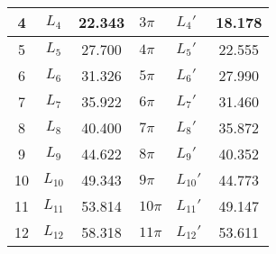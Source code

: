 \documentclass{../template/Report}
\begin{document}
\begin{fullreportonly}
\begin{figure}[H]
\begin{table}[H]
\begin{tabular}{|c|c|c|C{5em}|C{3em}|c|}
			                                                         & $L_4$                                                                & 22.343                                & $3\pi$                    & $L_4'$                                            & 18.178 \\
			                                                         & $L_5$                                                                & 27.700                                & $4\pi$                    & $L_5'$                                            & 22.555 \\
			                                                         & $L_6$                                                                & 31.326                                & $5\pi$                    & $L_6'$                                            &27.990  \\
			                                                         & $L_7$                                                                & 35.922                                & $6\pi$                    & $L_7'$                                            & 31.460 \\
			                                                         & $L_8$                                                                & 40.400                                & $7\pi$                    & $L_8'$                                            & 35.872 \\
			                                                         & $L_9$                                                                & 44.622                                & $8\pi$                    & $L_9'$                                            & 40.352 \\
			                                                        & $L_{10}$                                                               & 49.343                                & $9\pi$                    & $L_{10}'$                                           & 44.773 \\
			                                                        & $L_{11}$                                                               & 53.814                                & $10\pi$                    & $L_{11}'$                                           & 49.147 \\
			                                                        & $L_{12}$                                                               & 58.318                                & $11\pi$                    & $L_{12}'$                                           & 53.611 \\

\end{tabular}
\end{table}
\end{figure}
\end{fullreportonly}
\end{document}
